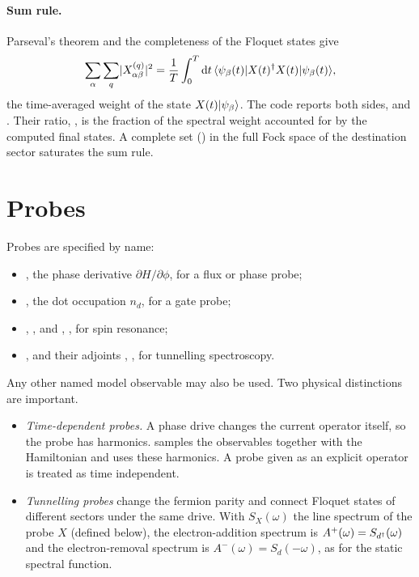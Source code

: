 \paragraph{Sum rule.}
Parseval's theorem and the completeness of the Floquet states give
\begin{equation}\label{eq:sum-rule}
  \sum_\alpha\sum_q\lvert X^{(q)}_{\alpha\beta}\rvert^2=\frac1T\int_0^T\mathrm{d} t\,
  \langle \psi_\beta(t)\vert X(t)^\dagger X(t)\vert \psi_\beta(t)\rangle ,
\end{equation}
the time-averaged weight of the state $X(t)\lvert \psi_\beta\rangle$. The code reports both sides,
 and . Their ratio, , is the fraction of the
spectral weight accounted for by the computed final states. A complete set
() in the full Fock space of the destination sector saturates the sum rule.

\section{Probes}

Probes are specified by name:
\begin{itemize}
\item {}, the phase derivative $\partial H/\partial\phi$, for a flux or phase probe;
\item {}, the dot occupation $n_d$, for a gate probe;
\item {}, ,  and , , for
spin resonance;
\item {},  and their adjoints , ,
for tunnelling spectroscopy.
\end{itemize}
Any other named model observable may also be used. Two physical distinctions are important.
\begin{itemize}
\item \emph{Time-dependent probes.} A phase drive changes the current operator itself, so the
probe has harmonics. \pkg{} samples the observables together with the Hamiltonian and uses
these harmonics. A probe given as an explicit operator is treated as time independent.
\item \emph{Tunnelling probes} change the fermion parity and connect Floquet states of
different sectors under the same drive. With $S_X(\omega)$ the line spectrum of the probe
$X$ (defined below), the electron-addition spectrum is $A^+(\omega)=S_{d^\dagger}(\omega)$ and
the electron-removal spectrum is $A^-(\omega)=S_d(-\omega)$, as for the static spectral
function.
\end{itemize}

